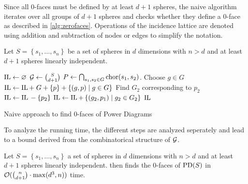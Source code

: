 Since all $0$-faces must be defined by at least $d+1$ spheres, the naive algorithm iterates over all groups of $d+1$ spheres and checks whether they define a $0$-face as described in \cref{alg:zerofaces}.
Operations of the incidence lattice are denoted using addition and subtraction of nodes or edges to simplify the notation.
\begin{algorithm}[tb]
    Let $S = \left\{ s_1, \dots, s_n \right\}$ be a set of spheres in $d$ dimensions with $n > d$ and at least $d+1$ spheres linearly independent.

    \begin{algorithmic}[1]
            \State $\operatorname{IL} \gets \varnothing$
            \State $\mathcal{G} \gets \binom{S}{d + 1}$
            \Statex
                \State $P \gets \bigcap_{s_1, s_2 \in G} \operatorname{chor}(s_1, s_2)$.
                    \State Choose $g \in G$
                        \State $\operatorname{IL} \gets \operatorname{IL} +\; G + \left\{ p \right\} + \left\{ (g, p) \mid g \in G \right\}$
                    \EndIf
                \EndIf
            \EndFor
            \Statex
                    \State Find $G_2$ corresponding to $p_2$
                    \State $\operatorname{IL} \gets \operatorname{IL}{} - \left\{ p_2 \right\}$
                    \State $\operatorname{IL} \gets \operatorname{IL} + \left\{ (g_2, p_1) \mid g_2 \in G_2 \right\}$
                \EndIf
            \EndFor
            \State \Return $\operatorname{IL}$
        \EndFunction
    \end{algorithmic}
    \caption{Naive approach to find $0$-faces of Power Diagrams}
    \label{alg:zerofaces}
\end{algorithm}
To analyze the running time, the different steps are analyzed seperately and lead to a bound derived from the combinatorical structure of $\mathcal{G}$.
\begin{theorem}
    Let $S = \left\{ s_1, \dots, s_n \right\}$ a set of spheres in $d$ dimensions with $n > d$ and at least $d + 1$ spheres linearly independent.
     then finds the $0$-faces of $\operatorname{PD}(S)$ in $\mathcal{O}(\binom{n}{d + 1} \cdot \max(d^3, n))$ time.
\end{theorem}
